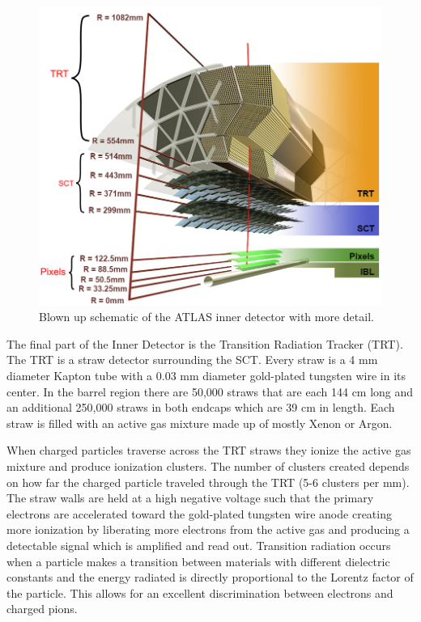 \begin{figure}[ht!]
	\centering
	\includegraphics[width=0.7\columnwidth]{../ThesisImages/LHCImages/ATLASInnerStructure.png}
	\caption[Blown up schematic of the ATLAS inner detector with more detail.]{Blown up schematic of the ATLAS inner detector with more detail\cite{Potamianos:2016ptf}.
	}
	\label{fig:ATLASInnerDet}
\end{figure}

The final part of the Inner Detector is the Transition Radiation Tracker (TRT)\cite{Mindur:2017nqn}.  The TRT is a straw detector surrounding the SCT.  Every straw is a 4 mm diameter Kapton tube with a 0.03 mm diameter gold-plated tungsten wire in its center.  In the barrel region there are 50,000 straws that are each 144 cm long and an additional 250,000 straws in both endcaps which are 39 cm in length.  Each straw is filled with an active gas mixture made up of mostly Xenon or Argon. 

When charged particles traverse across the TRT straws they ionize the active gas mixture and produce ionization clusters.  The number of clusters created depends on how far the charged particle traveled through the TRT (5-6 clusters per mm).  The straw walls are held at a high negative voltage such that the primary electrons are accelerated toward the gold-plated tungsten wire anode creating more ionization by liberating more electrons from the active gas and producing a detectable signal which is amplified and read out.  Transition radiation occurs when a particle makes a transition between materials with different dielectric constants and the energy radiated is directly proportional to the Lorentz factor of the particle.  This allows for an excellent discrimination between electrons and charged pions.



